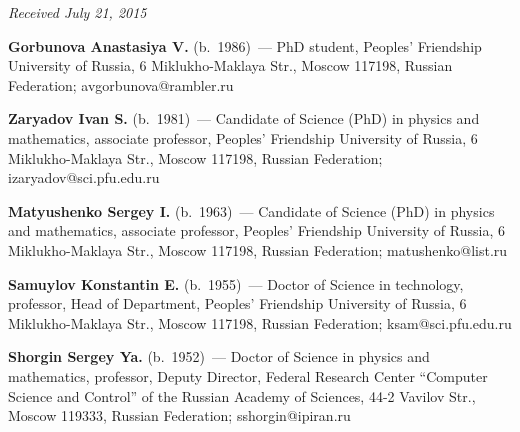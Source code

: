 \vspace*{-3pt}

\hfill{\small\textit{Received July 21, 2015}}


\Contr


\noindent
\textbf{Gorbunova Anastasiya V.} (b.\ 1986)~---
PhD student, %
Peoples' Friendship University of Russia,
6 Miklukho-Maklaya Str., Moscow 117198, Russian Federation; 
avgorbunova@rambler.ru

\vspace*{3pt}

\noindent
\textbf{Zaryadov Ivan S.} (b.\ 1981)~---
Candidate of Science (PhD) in physics and mathematics, associate professor, 
Peoples' Friendship University of Russia,
6 Miklukho-Maklaya Str., Moscow 117198, Russian Federation;  
izaryadov@sci.pfu.edu.ru

 
\vspace*{3pt}

\noindent
\textbf{Matyushenko Sergey I.} (b.\ 1963)~---
Candidate of Science (PhD) in physics and mathematics, associate professor, 
Peoples' Friendship University of Russia,
6 Miklukho-Maklaya Str., Moscow 117198, Russian Federation;  
matushenko@list.ru

\vspace*{3pt}

\noindent
\textbf{Samuylov Konstantin E.} (b.\ 1955)~---
Doctor of Science in technology, professor, Head of Department, 
Peoples' Friendship University of Russia,
6 Miklukho-Maklaya Str., Moscow 117198, Russian Federation;  
ksam@sci.pfu.edu.ru
 
\vspace*{3pt}

\noindent
\textbf{Shorgin Sergey Ya.} (b.\ 1952)~---
Doctor of Science in physics and mathematics, professor, 
Deputy Director, Federal Research Center ``Computer Science and Control'' of 
the Russian Academy of Sciences, 44-2 Vavilov Str., 
Moscow 119333, Russian Federation; sshorgin@ipiran.ru 

 
\label{end\stat}


\renewcommand{\bibname}{\protect\rm Литература}